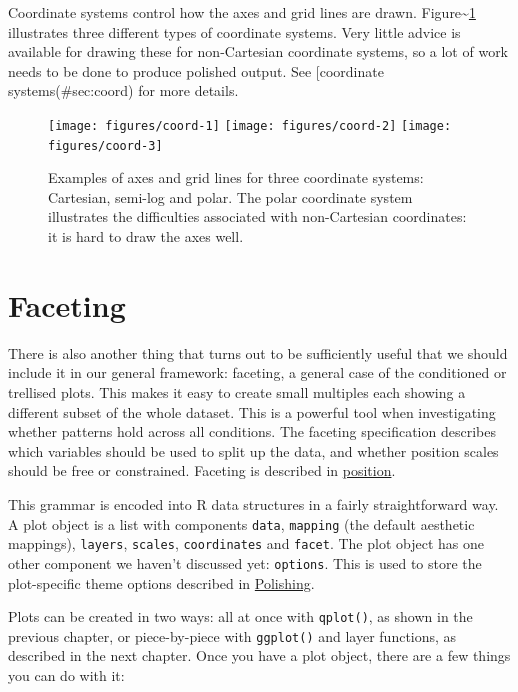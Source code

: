 Coordinate systems control how the axes and grid lines are drawn.
Figure\textasciitilde{}\ref{fig:coord} illustrates three different types
of coordinate systems. Very little advice is available for drawing these
for non-Cartesian coordinate systems, so a lot of work needs to be done
to produce polished output. See {[}coordinate systems(\#sec:coord) for
more details.

\begin{figure}
\texttt{[image: figures/coord-1]} \texttt{[image: figures/coord-2]} \texttt{[image: figures/coord-3]} \caption{Examples of axes and grid lines for three coordinate systems: Cartesian, semi-log and polar. The polar coordinate system illustrates the difficulties associated with non-Cartesian coordinates: it is hard to draw the axes well.\label{fig:coord}}
\end{figure}

\section{Faceting}\label{sec:intro-faceting}

There is also another thing that turns out to be sufficiently useful
that we should include it in our general framework: faceting, a general
case of the conditioned or trellised plots. This makes it easy to create
small multiples each showing a different subset of the whole dataset.
This is a powerful tool when investigating whether patterns hold across
all conditions. The faceting specification describes which variables
should be used to split up the data, and whether position scales should
be free or constrained. Faceting is described in
\hyperref[cha:position]{position}.


This grammar is encoded into R data structures in a fairly
straightforward way. A plot object is a list with components
\texttt{data}, \texttt{mapping} (the default aesthetic mappings),
\texttt{layers}, \texttt{scales}, \texttt{coordinates} and
\texttt{facet}. The plot object has one other component we haven't
discussed yet: \texttt{options}. This is used to store the plot-specific
theme options described in \hyperref[cha:polishing]{Polishing}.

Plots can be created in two ways: all at once with \texttt{qplot()}, as
shown in the previous chapter, or piece-by-piece with \texttt{ggplot()}
and layer functions, as described in the next chapter. Once you have a
plot object, there are a few things you can do with it:

